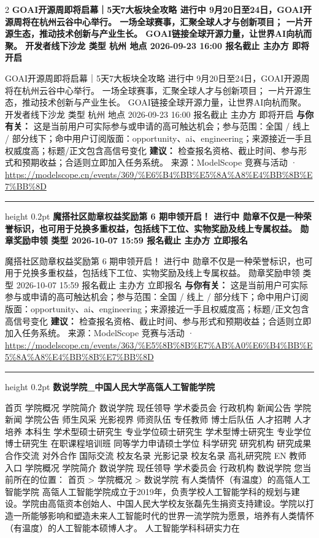 \documentclass[10.5pt]{ctexart}
\begin{document}
\begin{multicols}{2}
{\large\bfseries GOAI开源周即将启幕｜5天7大板块全攻略 进行中 9月20日至24日，GOAI开源周将在杭州云谷中心举行。 一场全球赛事，汇聚全球人才与创新项目； 一片开源生态，推动技术创新与产业生长。 GOAI链接全球开源力量，让世界AI向杭而聚。 开发者线下沙龙 类型 杭州 地点 2026-09-23 16:00 报名截止 主办方 即将开启}\par
GOAI开源周即将启幕｜5天7大板块全攻略 进行中 9月20日至24日，GOAI开源周将在杭州云谷中心举行。 一场全球赛事，汇聚全球人才与创新项目； 一片开源生态，推动技术创新与产业生长。 GOAI链接全球开源力量，让世界AI向杭而聚。 开发者线下沙龙 类型 杭州 地点 2026-09-23 16:00 报名截止 主办方 即将开启
\textbf{与你有关：} 这是当前用户可实际参与或申请的高可触达机会；参与范围：全国 / 线上 / 部分线下；命中用户订阅版面：opportunity、ai、engineering；来源接近一手且权威度高；标题/正文包含高信号变化
\textbf{建议：} 检查报名资格、截止时间、参与形式和预期收益；合适则立即加入任务系统。
{\footnotesize\color{ormuted} 来源：ModelScope 竞赛与活动 · \url{https://modelscope.cn/events/369/%E6%B4%BB%E5%8A%A8%E4%BB%8B%E7%BB%8D}}
\vspace{2mm}
\hrule height 0.2pt
\vspace{2mm}
{\large\bfseries 魔搭社区勋章权益奖励第 6 期申领开启！ 进行中 勋章不仅是一种荣誉标识，也可用于兑换多重权益，包括线下工位、实物奖励及线上专属权益。 勋章奖励申领 类型 2026-10-07 15:59 报名截止 主办方 立即报名}\par
魔搭社区勋章权益奖励第 6 期申领开启！ 进行中 勋章不仅是一种荣誉标识，也可用于兑换多重权益，包括线下工位、实物奖励及线上专属权益。 勋章奖励申领 类型 2026-10-07 15:59 报名截止 主办方 立即报名
\textbf{与你有关：} 这是当前用户可实际参与或申请的高可触达机会；参与范围：全国 / 线上 / 部分线下；命中用户订阅版面：opportunity、ai、engineering；来源接近一手且权威度高；标题/正文包含高信号变化
\textbf{建议：} 检查报名资格、截止时间、参与形式和预期收益；合适则立即加入任务系统。
{\footnotesize\color{ormuted} 来源：ModelScope 竞赛与活动 · \url{https://modelscope.cn/events/363/%E5%8B%8B%E7%AB%A0%E6%B4%BB%E5%8A%A8%E4%BB%8B%E7%BB%8D}}
\vspace{2mm}
\hrule height 0.2pt
\vspace{2mm}
{\large\bfseries 数说学院\_中国人民大学高瓴人工智能学院}\par
首页 学院概况 学院简介 数说学院 现任领导 学术委员会 行政机构 新闻公告 学院新闻 学院公告 师生风采 光影视界 师资队伍 专任教师 博士后队伍 人才招聘 人才培养 本科生 学术型硕士研究生 专业学位硕士研究生 学术型博士研究生 专业学位博士研究生 在职课程培训班 同等学力申请硕士学位 科学研究 研究机构 研究成果 合作交流 对外合作 国际交流 校友名录 光影记录 校友名录 高礼研究院 EN 教师入口 学院概况 学院简介 数说学院 现任领导 学术委员会 行政机构 数说学院 您当前所在的位置： 首页 > 学院概况 > 数说学院 有人类情怀（有温度）的高瓴人工智能学院 高瓴人工智能学院成立于2019年，负责学校人工智能学科的规划与建设。学院由高瓴资本创始人、中国人民大学校友张磊先生捐资支持建设。学院以打造一所能够影响和塑造未来人工智能时代的世界一流学院为愿景，培养有人类情怀（有温度）的人工智能本硕博人才。 人工智能学科科研实力在

\end{multicols}
\end{document}
